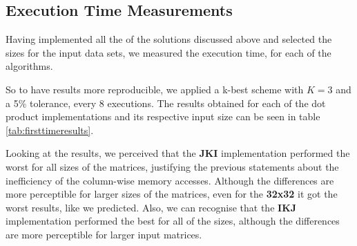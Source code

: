 \documentclass[twoside,twocolumn]{article}
\begin{document}
\subsection{Execution Time Measurements}

Having implemented all the of the solutions discussed above and selected the sizes for the input data sets, we measured the execution time, for each of the algorithms.

So to have results more reproducible, we applied a k-best scheme with $K = 3$ and a 5\% tolerance, every 8 executions. The results obtained for each of the dot product implementations and its respective input size can be seen in table \ref{tab:firsttimeresults}.

\begin{table}
\centering
{}
\caption{First implementations execution time.}
\label{tab:firsttimeresults}
\end{table}

Looking at the results, we perceived that the \textbf{JKI} implementation performed the worst for all sizes of the matrices, justifying the previous statements about the inefficiency of the column-wise memory accesses. Although the differences are more perceptible for larger sizes of the matrices, even for the \textbf{32x32} it got the worst results, like we predicted. Also, we can recognise that the \textbf{IKJ} implementation performed the best for all of the sizes, although the differences are more perceptible for larger input matrices.
\end{document}
